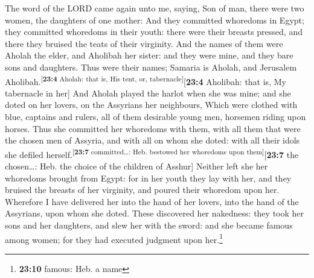 The word of the LORD came again unto me, saying,
 Son of man, there were two women, the daughters of one
mother:  And they committed whoredoms in Egypt; they
committed whoredoms in their youth: there were their breasts pressed,
and there they bruised the teats of their virginity.  And
the names of them were Aholah the elder, and Aholibah her sister: and
they were mine, and they bare sons and daughters. Thus were their names;
Samaria is Aholah, and Jerusalem
Aholibah.\textsuperscript{{[}\textbf{23:4} Aholah: that is, His tent,
or, tabernacle{]}}{[}\textbf{23:4} Aholibah: that is, My tabernacle in
her{]}  And Aholah played the harlot when she was mine;
and she doted on her lovers, on the Assyrians her neighbours,
 Which were clothed with blue, captains and rulers, all of
them desirable young men, horsemen riding upon horses. 
Thus she committed her whoredoms with them, with all them that were the
chosen men of Assyria, and with all on whom she doted: with all their
idols she defiled herself.\textsuperscript{{[}\textbf{23:7}
committed\ldots: Heb. bestowed her whoredoms upon
them{]}}{[}\textbf{23:7} the chosen\ldots: Heb. the choice of the
children of Asshur{]}  Neither left she her whoredoms
brought from Egypt: for in her youth they lay with her, and they bruised
the breasts of her virginity, and poured their whoredom upon her.
 Wherefore I have delivered her into the hand of her
lovers, into the hand of the Assyrians, upon whom she doted.
 These discovered her nakedness: they took her sons and
her daughters, and slew her with the sword: and she became famous among
women; for they had executed judgment upon her.\footnote{\textbf{23:10}
  famous: Heb. a name}

